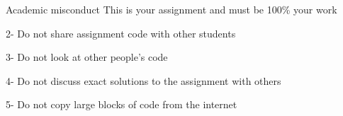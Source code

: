 \documentclass[week3]{csse1001}
\begin{document}
\begin{topic}{Academic misconduct}
This is your assignment and must be 100\% your work

\begin{subtopic}{2-}
Do not share assignment code with other students
\end{subtopic}

\begin{subtopic}{3-}
Do not look at other people's code
\end{subtopic}

\begin{subtopic}{4-}
Do not discuss exact solutions to the assignment with others
\end{subtopic}

\begin{subtopic}{5-}
Do not copy large blocks of code from the internet
\end{subtopic}

\end{topic}
\end{document}

